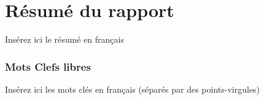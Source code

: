 
\chapter*{Résumé du rapport}%
\label{chap:abstract_fr}

Insérez ici le résumé en français

\subsection*{Mots Clefs libres}
Insérez ici les mots clés en français (séparés par des points-virgules)

